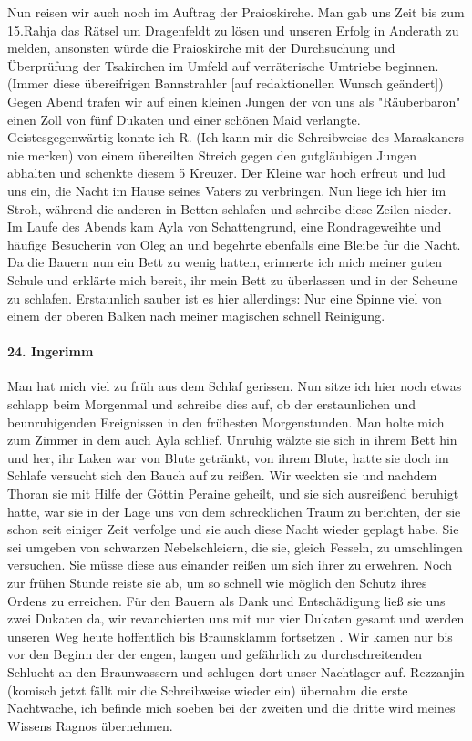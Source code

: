 Nun reisen wir auch noch im Auftrag der Praioskirche. Man gab uns Zeit bis zum 15.Rahja das Rätsel um Dragenfeldt  zu lösen und unseren Erfolg in Anderath zu melden, ansonsten würde die Praioskirche mit der Durchsuchung und Überprüfung der Tsakirchen im Umfeld auf verräterische Umtriebe beginnen. (Immer diese übereifrigen Bannstrahler [auf redaktionellen Wunsch geändert]) Gegen Abend trafen wir auf einen kleinen Jungen der von uns als "Räuberbaron" einen Zoll von fünf Dukaten und einer schönen Maid verlangte. Geistesgegenwärtig konnte ich R. (Ich kann mir die Schreibweise des Maraskaners nie merken) von einem übereilten Streich gegen den gutgläubigen Jungen abhalten und schenkte diesem 5 Kreuzer. Der Kleine war hoch erfreut und lud uns ein, die Nacht im Hause seines Vaters zu verbringen. Nun liege ich hier im Stroh, während die anderen in Betten schlafen und schreibe diese Zeilen nieder. Im Laufe des Abends kam Ayla von Schattengrund, eine Rondrageweihte und häufige Besucherin von Oleg an und begehrte ebenfalls eine Bleibe für die Nacht. Da die Bauern nun ein Bett zu wenig hatten, erinnerte ich mich meiner guten Schule und erklärte mich bereit, ihr mein Bett zu überlassen und in der Scheune zu schlafen. Erstaunlich sauber ist es hier allerdings: Nur eine Spinne viel von einem der oberen Balken nach meiner magischen schnell Reinigung.

\paragraph{24. Ingerimm}

Man hat mich viel zu früh aus dem Schlaf gerissen. Nun sitze ich hier noch etwas schlapp beim Morgenmal und schreibe dies auf, ob der erstaunlichen und beunruhigenden Ereignissen in den frühesten Morgenstunden. Man holte mich zum Zimmer in dem auch Ayla schlief. Unruhig wälzte sie sich in ihrem Bett hin und her, ihr Laken war von Blute getränkt, von ihrem Blute, hatte sie doch im Schlafe versucht sich den Bauch auf zu reißen. Wir weckten sie und nachdem Thoran sie mit Hilfe der Göttin Peraine geheilt, und sie sich ausreißend beruhigt hatte, war sie in der Lage uns von dem schrecklichen Traum zu berichten, der sie schon seit einiger Zeit verfolge und sie auch diese Nacht wieder geplagt habe. Sie sei umgeben von schwarzen Nebelschleiern, die sie, gleich Fesseln, zu umschlingen versuchen. Sie müsse diese aus einander reißen um sich ihrer zu erwehren. Noch zur frühen Stunde reiste sie ab, um so schnell wie möglich den Schutz ihres Ordens zu erreichen. Für den Bauern als Dank und Entschädigung ließ sie uns zwei Dukaten da, wir revanchierten uns mit nur vier Dukaten gesamt und werden unseren Weg heute hoffentlich bis Braunsklamm fortsetzen .
Wir kamen nur bis vor den Beginn der der engen, langen und gefährlich zu durchschreitenden Schlucht an den Braunwassern und schlugen dort unser Nachtlager auf. Rezzanjin (komisch jetzt fällt mir die Schreibweise wieder ein) übernahm die erste Nachtwache, ich befinde mich soeben bei der zweiten und die dritte wird meines Wissens Ragnos übernehmen.

